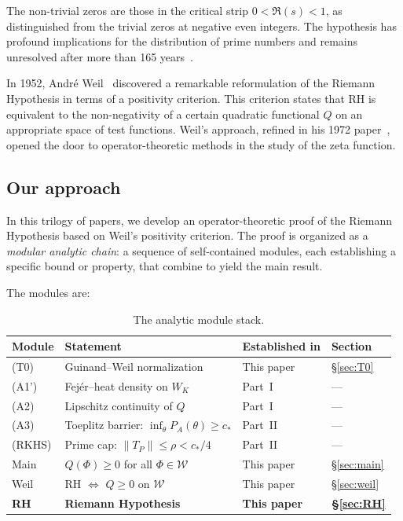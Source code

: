 \documentclass[11pt,a4paper]{article}
\theoremstyle{definition}
\theoremstyle{remark}
\begin{document}
\noindent The non-trivial zeros are those in the critical strip $0 < \Re(s) < 1$, as distinguished from the trivial zeros at negative even integers. The hypothesis has profound implications for the distribution of prime numbers and remains unresolved after more than 165 years~\cite{Edwards1974,Titchmarsh1986,IwaniecKowalski2004}.

In 1952, Andr\'e Weil~\cite{Weil1952} discovered a remarkable reformulation of the Riemann Hypothesis in terms of a positivity criterion. This criterion states that RH is equivalent to the non-negativity of a certain quadratic functional $Q$ on an appropriate space of test functions. Weil's approach, refined in his 1972 paper~\cite{Weil1972}, opened the door to operator-theoretic methods in the study of the zeta function.

\subsection{Our approach}

In this trilogy of papers, we develop an operator-theoretic proof of the Riemann Hypothesis based on Weil's positivity criterion. The proof is organized as a \emph{modular analytic chain}: a sequence of self-contained modules, each establishing a specific bound or property, that combine to yield the main result.

The modules are:

\begin{table}[h]
\centering
\caption{The analytic module stack.}
\label{tab:modules}
\begin{tabular}{@{}llll@{}}
\toprule
Module & Statement & Established in & Section \\
\midrule
(T0) & Guinand--Weil normalization & This paper & \S\ref{sec:T0} \\
(A1') & Fej\'er--heat density on $W_K$ & Part~I~\cite{PartI} & --- \\
(A2) & Lipschitz continuity of $Q$ & Part~I~\cite{PartI} & --- \\
(A3) & Toeplitz barrier: $\inf_\theta P_A(\theta) \geq c_*$ & Part~II~\cite{PartII} & --- \\
(RKHS) & Prime cap: $\|T_P\| \leq \rho < c_*/4$ & Part~II~\cite{PartII} & --- \\
Main & $Q(\Phi) \geq 0$ for all $\Phi \in \mathcal{W}$ & This paper & \S\ref{sec:main} \\
Weil & RH $\Leftrightarrow$ $Q \geq 0$ on $\mathcal{W}$ & This paper & \S\ref{sec:weil} \\
\textbf{RH} & \textbf{Riemann Hypothesis} & \textbf{This paper} & \textbf{\S\ref{sec:RH}} \\
\bottomrule
\end{tabular}
\end{table}
\end{document}
